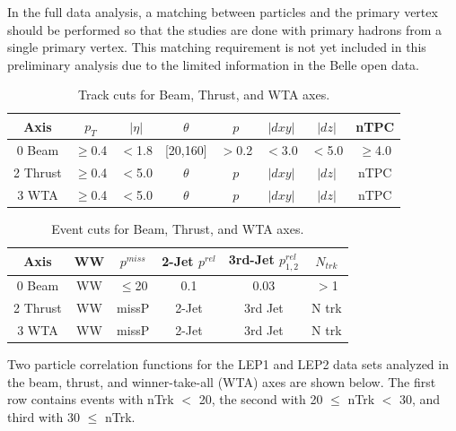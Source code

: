 In the full data analysis, a matching between particles and the primary vertex should be performed so that the studies are done with primary hadrons from a single primary vertex. This matching requirement is not yet included in this preliminary analysis due to the limited information in the Belle open data. 

\begin{table}[h!]\centering
{}

\begin{tabular}{cccccccc}\toprule
Axis & ${p_{T}}$ & $|\eta|$ & $\theta$ & ${p}$ & $|dxy|$ & $|dz|$ & nTPC\\
\midrule
\rowcolor{black!20} {0} Beam & $\geq$0.4 & $<$1.8 & [20,160] & $>$0.2 & $<$3.0 & $<$5.0 & $\geq$4.0 \\
{2} Thrust & $\geq$0.4 & $<$5.0 & $\theta$ & ${p}$ & $|dxy|$ & $|dz|$ & nTPC \\
\rowcolor{black!20} {3} WTA & $\geq$0.4 & $<$5.0 & $\theta$ & ${p}$ & $|dxy|$ & $|dz|$ & nTPC \\
\bottomrule
\end{tabular}
\caption{Track cuts for Beam, Thrust, and WTA axes.}
\end{table}

\begin{table}[h!]\centering
{}

\begin{tabular}{cccccc}\toprule
Axis & WW & ${p^{miss}}$ & 2-Jet ${p^{rel}}$ & 3rd-Jet ${p^{rel}_{1,2}}$ &
$N_{trk}$ \\
\midrule
\rowcolor{black!20} {0} Beam & WW & $\leq$20 & 0.1 & 0.03 & $>$1 \\
{2} Thrust & WW & missP & 2-Jet & 3rd Jet & N trk \\
\rowcolor{black!20} {3} WTA & WW & missP & 2-Jet & 3rd Jet & N trk \\
\bottomrule
\end{tabular}
\caption{Event cuts for Beam, Thrust, and WTA axes.}
\end{table}

Two particle correlation functions for the LEP1 and LEP2 data sets analyzed in the beam, thrust, and winner-take-all (WTA) axes are shown below. The first row contains events with nTrk $<$ 20, the second with 20 $\leq$ nTrk $<$ 30, and third with 30 $\leq$ nTrk.



